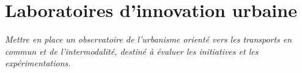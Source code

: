 \documentclass[../main.tex]{subfiles}
\begin{document}
    \newpage

    \vspace{15pt}
\section{Laboratoires d'innovation urbaine}

\begin{block}[Évaluer]
    \linespread{0.9}\selectfont %
    \textit{\small{Mettre en place un observatoire de l'urbanisme orienté vers les transports en commun et de l'intermodalité, destiné à évaluer les initiatives et les expérimentations.}}
\end{block}
\end{document}
